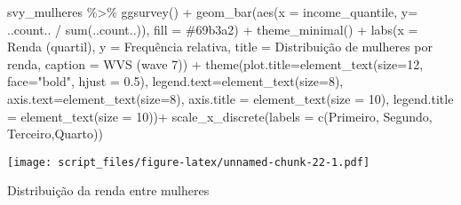\documentclass[
]{article}
\newenvironment{Shaded}{\begin{snugshade}}{\end{snugshade}}
\newcommand{\AttributeTok}[1]{\textcolor[rgb]{0.77,0.63,0.00}{#1}}
\newcommand{\DecValTok}[1]{\textcolor[rgb]{0.00,0.00,0.81}{#1}}
\newcommand{\FloatTok}[1]{\textcolor[rgb]{0.00,0.00,0.81}{#1}}
\newcommand{\FunctionTok}[1]{\textcolor[rgb]{0.00,0.00,0.00}{#1}}
\newcommand{\NormalTok}[1]{#1}
\newcommand{\SpecialCharTok}[1]{\textcolor[rgb]{0.00,0.00,0.00}{#1}}
\newcommand{\StringTok}[1]{\textcolor[rgb]{0.31,0.60,0.02}{#1}}
\begin{document}
\begin{Shaded}
\begin{Highlighting}[]
\NormalTok{svy\_mulheres }\SpecialCharTok{\%\textgreater{}\%}
  \FunctionTok{ggsurvey}\NormalTok{() }\SpecialCharTok{+}
  \FunctionTok{geom\_bar}\NormalTok{(}\FunctionTok{aes}\NormalTok{(}\AttributeTok{x =}\NormalTok{ income\_quantile, }\AttributeTok{y=}\NormalTok{ ..count.. }\SpecialCharTok{/} \FunctionTok{sum}\NormalTok{(..count..)), }\AttributeTok{fill =} \StringTok{\textquotesingle{}\#69b3a2\textquotesingle{}}\NormalTok{) }\SpecialCharTok{+}
  \FunctionTok{theme\_minimal}\NormalTok{() }\SpecialCharTok{+}
  \FunctionTok{labs}\NormalTok{(}\AttributeTok{x =} \StringTok{\textquotesingle{}Renda (quartil)\textquotesingle{}}\NormalTok{,}
       \AttributeTok{y =} \StringTok{\textquotesingle{}Frequência relativa\textquotesingle{}}\NormalTok{,}
       \AttributeTok{title =} \StringTok{\textquotesingle{}Distribuição de mulheres por renda\textquotesingle{}}\NormalTok{,}
       \AttributeTok{caption =} \StringTok{\textquotesingle{}WVS (wave 7)\textquotesingle{}}\NormalTok{) }\SpecialCharTok{+}
  \FunctionTok{theme}\NormalTok{(}\AttributeTok{plot.title=}\FunctionTok{element\_text}\NormalTok{(}\AttributeTok{size=}\DecValTok{12}\NormalTok{, }\AttributeTok{face=}\StringTok{"bold"}\NormalTok{, }\AttributeTok{hjust =} \FloatTok{0.5}\NormalTok{),}
        \AttributeTok{legend.text=}\FunctionTok{element\_text}\NormalTok{(}\AttributeTok{size=}\DecValTok{8}\NormalTok{),}
        \AttributeTok{axis.text=}\FunctionTok{element\_text}\NormalTok{(}\AttributeTok{size=}\DecValTok{8}\NormalTok{),}
        \AttributeTok{axis.title =} \FunctionTok{element\_text}\NormalTok{(}\AttributeTok{size =} \DecValTok{10}\NormalTok{),}
        \AttributeTok{legend.title =} \FunctionTok{element\_text}\NormalTok{(}\AttributeTok{size =} \DecValTok{10}\NormalTok{))}\SpecialCharTok{+}
  \FunctionTok{scale\_x\_discrete}\NormalTok{(}\AttributeTok{labels =} \FunctionTok{c}\NormalTok{(}\StringTok{\textquotesingle{}Primeiro\textquotesingle{}}\NormalTok{, }\StringTok{\textquotesingle{}Segundo\textquotesingle{}}\NormalTok{, }\StringTok{\textquotesingle{}Terceiro\textquotesingle{}}\NormalTok{,}\StringTok{\textquotesingle{}Quarto\textquotesingle{}}\NormalTok{))}
\end{Highlighting}
\end{Shaded}

\texttt{[image: script\_files/figure-latex/unnamed-chunk-22-1.pdf]}

Distribuição da renda entre mulheres
\end{document}
